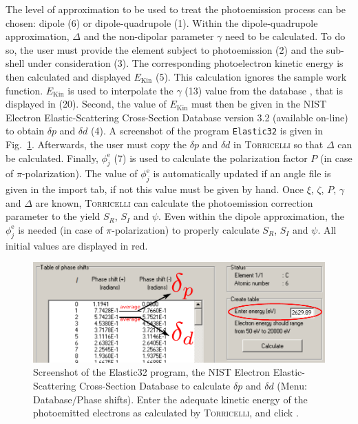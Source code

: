 \documentclass[oldfontcommands,openany,oneside]{memoir}
\begin{document}
The level of approximation to be used to treat the photoemission process can be chosen: dipole (6) or dipole-quadrupole (1). Within the dipole-quadrupole approximation, $\Delta$  and the non-dipolar parameter $\gamma$ need to be calculated. To do so, the user must provide the element subject to photoemission (2) and the sub-shell under consideration (3). The corresponding photoelectron kinetic energy is then calculated and displayed $E_\mathrm{Kin}$ (5). This calculation ignores the sample work function. $E_\mathrm{Kin}$ is used to interpolate the $\gamma$ (13) value from the database \cite{Trzhaskovskaya2002a,Trzhaskovskaya2002b}, that is displayed in (20). Second, the value of $E_\mathrm{Kin}$ must then be given in the NIST Electron Elastic-Scattering Cross-Section Database version 3.2 (available on-line) to obtain $\delta p$ and $\delta d$ (4). A screenshot of the program \verb+Elastic32+ is given in Fig.~\ref{fig:NIST}. Afterwards, the user must copy the $\delta p$ and $\delta d$ in \textsc{Torricelli} so that $\Delta$ can be calculated. Finally, $\phi_j^\mathrm{e}$ (7) is used to calculate the polarization factor $P$ (in case of $\pi$-polarization). The value of $\phi_j^\mathrm{e}$ is automatically updated if an angle file is given in the import tab, if not this value must be given by hand. Once $\xi$, $\zeta$, $P$, $\gamma$ and $\Delta$ are known, \textsc{Torricelli} can calculate the photoemission correction parameter to the yield $S_R$, $S_I$ and $\psi$. Even within the dipole approximation, the $\phi_j^\mathrm{e}$ is needed (in case of $\pi$-polarization) to properly calculate $S_R$, $S_I$ and $\psi$. All initial values are displayed in red.
\begin{figure}[!b]
  \centering
  \includegraphics[width=.6\textwidth]{img/NIST.pdf}
  \caption{Screenshot of the Elastic32 program, the NIST Electron Elastic-Scattering Cross-Section Database to calculate $\delta p$ and $\delta d$ (Menu: Database/Phase shifts). Enter the adequate kinetic energy of the photoemitted electrons as calculated by \textsc{Torricelli}, and click . }
  \label{fig:NIST}
\end{figure}
\end{document}

